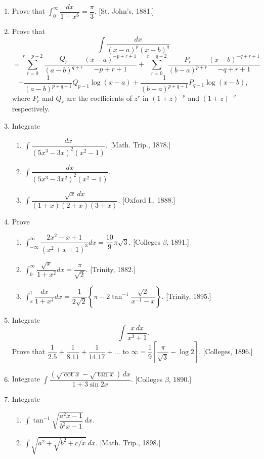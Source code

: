 \documentclass[11pt, a4paper]{article}
\newcommand{\source}[1]{\hfill\textnormal{[#1]}}
\begin{document}
\begin{enumerate}[leftmargin=2em]
\item Prove that $\displaystyle\int_0^\infty \dfrac{dx}{1+x^6}=\dfrac{\pi}{3}$. \source{St. John's, 1881.}

\item Prove that
\[
\int \dfrac{dx}{(x-a)^p(x-b)^q}
\]
\[
=\sum_{r=0}^{r=p-2} \dfrac{Q_r}{(a-b)^{q+r}}\dfrac{(x-a)^{-p+r+1}}{-p+r+1}+\sum_{r=0}^{r=q-2} \dfrac{P_r}{(b-a)^{p+r}}\dfrac{(x-b)^{-q+r+1}}{-q+r+1}
\]
\[
+\dfrac{1}{(a-b)^{p+q-1}}Q_{p-1}\log(x-a)+\dfrac{1}{(b-a)^{p+q-1}}P_{q-1}\log(x-b),
\]
where $P_r$ and $Q_r$ are the coefficients of $z^r$ in $(1+z)^{-p}$ and $(1+z)^{-q}$ respectively.

\item Integrate
\begin{enumerate}[label=(\roman*)]
\item $\displaystyle\int \dfrac{dx}{(5x^3-3x)^2(x^2-1)}$. \source{Math. Trip., 1878.}
\item $\displaystyle\int \dfrac{dx}{(5x^3-3x^2)^2(x^2-1)}$.
\item $\displaystyle\int \dfrac{\sqrt{x}\,dx}{(1+x)(2+x)(3+x)}$. \source{Oxford I., 1888.}
\end{enumerate}

\item Prove
\begin{enumerate}[label=(\roman*)]
\item $\displaystyle\int_{-\infty}^{\infty} \dfrac{2x^2-x+1}{(x^2+x+1)^3}dx=\dfrac{10}{9}\pi\sqrt3$. \source{Colleges $\beta$, 1891.}
\item $\displaystyle\int_0^\infty \dfrac{\sqrt{x}}{1+x^2}dx=\dfrac{\pi}{\sqrt2}$. \source{Trinity, 1882.}
\item $\displaystyle\int_x^1 \dfrac{dx}{1+x^4}dx=\dfrac{1}{2\sqrt2}\left\{\pi-2\tan^{-1}\dfrac{\sqrt2}{x^{-1}-x}\right\}$. \source{Trinity, 1895.}
\end{enumerate}

\item Integrate
\[
\int \dfrac{x\,dx}{x^3+1}.
\]
Prove that $\dfrac{1}{2.5}+\dfrac{1}{8.11}+\dfrac{1}{14.17}+\dots$ to $\infty = \dfrac19\left[\dfrac{\pi}{\sqrt3}-\log 2\right]$. \source{Colleges, 1896.}

\item Integrate $\displaystyle\int \dfrac{(\sqrt{\cot x}-\sqrt{\tan x})\,dx}{1+3\sin 2x}$. \source{Colleges $\beta$, 1890.}

\item Integrate
\begin{enumerate}[label=(\roman*)]
\item $\displaystyle\int \tan^{-1}\sqrt{\dfrac{a^2x-1}{b^2x-1}}\,dx$.
\item $\displaystyle\int \sqrt{a^2+\sqrt{b^2+c/x}}\,dx$. \source{Math. Trip., 1898.}
\end{enumerate}


\end{enumerate}
\end{document}
